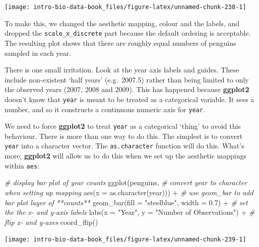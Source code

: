 \documentclass[
]{book}
\newenvironment{Shaded}{\begin{snugshade}}{\end{snugshade}}
\newcommand{\AttributeTok}[1]{\textcolor[rgb]{0.77,0.63,0.00}{#1}}
\newcommand{\CommentTok}[1]{\textcolor[rgb]{0.56,0.35,0.01}{\textit{#1}}}
\newcommand{\FloatTok}[1]{\textcolor[rgb]{0.00,0.00,0.81}{#1}}
\newcommand{\FunctionTok}[1]{\textcolor[rgb]{0.00,0.00,0.00}{#1}}
\newcommand{\NormalTok}[1]{#1}
\newcommand{\SpecialCharTok}[1]{\textcolor[rgb]{0.00,0.00,0.00}{#1}}
\newcommand{\StringTok}[1]{\textcolor[rgb]{0.31,0.60,0.02}{#1}}
\begin{document}
\begin{center}\texttt{[image: intro-bio-data-book\_files/figure-latex/unnamed-chunk-238-1]} \end{center}

To make this, we changed the aesthetic mapping, colour and the labels, and dropped the \texttt{scale\_x\_discrete} part because the default ordering is acceptable. The resulting plot shows that there are roughly equal numbers of penguins sampled in each year.

There is one small irritation. Look at the year axis labels and guides. These include non-existent `half years' (e.g.~2007.5) rather than being limited to only the observed years (2007, 2008 and 2009). This has happened because \textbf{ggplot2} doesn't know that \texttt{year} is meant to be treated as a categorical variable. It sees a number, and so it constructs a continuous numeric axis for \texttt{year}.

We need to force \textbf{ggplot2} to treat \texttt{year} as a categorical `thing' to avoid this behaviour. There is more than one way to do this. The simplest is to convert \texttt{year} into a character vector. The \texttt{as.character} function will do this. What's more, \textbf{ggplot2} will allow us to do this when we set up the aesthetic mappings within \texttt{aes}:

\begin{Shaded}
\begin{Highlighting}[]
\CommentTok{\# display bar plot of year counts}
\FunctionTok{ggplot}\NormalTok{(penguins,}
       \CommentTok{\# convert year to character when setting up mapping}
       \FunctionTok{aes}\NormalTok{(}\AttributeTok{x =} \FunctionTok{as.character}\NormalTok{(year))) }\SpecialCharTok{+} 
  \CommentTok{\# use geom\_bar to add bar plot layer of **counts**}
  \FunctionTok{geom\_bar}\NormalTok{(}\AttributeTok{fill =} \StringTok{"steelblue"}\NormalTok{, }\AttributeTok{width =} \FloatTok{0.7}\NormalTok{) }\SpecialCharTok{+} 
  \CommentTok{\# set the the x{-} and y{-}axis labels}
  \FunctionTok{labs}\NormalTok{(}\AttributeTok{x =} \StringTok{"Year"}\NormalTok{, }\AttributeTok{y =} \StringTok{"Number of Observations"}\NormalTok{) }\SpecialCharTok{+}
  \CommentTok{\# flip x{-} and y{-}axes}
  \FunctionTok{coord\_flip}\NormalTok{()}
\end{Highlighting}
\end{Shaded}

\begin{center}\texttt{[image: intro-bio-data-book\_files/figure-latex/unnamed-chunk-239-1]} \end{center}
\end{document}
